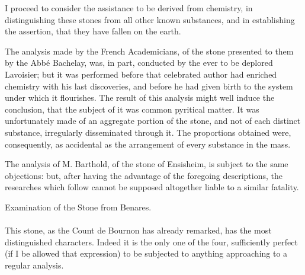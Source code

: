 \documentclass[a4paper, 12pt, oneside]{article}
\begin{document}
I proceed to consider the assistance to be derived from chemistry, in distinguishing these stones from all other known substances, and in establishing the assertion, that they have fallen on the earth.

The analysis made by the French Academicians, of the stone presented to them by the Abbé Bachelay, was, in part, conducted by the ever to be deplored Lavoisier; but it was performed before that celebrated author had enriched chemistry with his last discoveries, and before he had given birth to the system under which it flourishes. The result of this analysis might well induce the conclusion, that the subject of it was common pyritical matter. It was unfortunately made of an aggregate portion of the stone, and not of each distinct substance, irregularly disseminated through it. The proportions obtained were, consequently, as accidental as the arrangement of every substance in the mass.

The analysis of M. Barthold, of the stone of Ensisheim, is subject to the same objections: but, after having the advantage of the foregoing descriptions, the researches which follow cannot be supposed altogether liable to a similar fatality.
\begin{center}
Examination of the Stone from Benares.
\end{center}
\paragraph{}
This stone, as the Count de Bournon has already remarked, has the most distinguished characters. Indeed it is the only one of the four, sufficiently perfect (if I be allowed that expression) to be subjected to anything approaching to a regular analysis.
\end{document}
